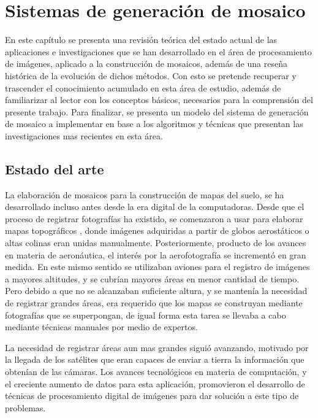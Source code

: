 \chapter{Sistemas de generación de mosaico}
\label{capitulo2}

En este capítulo se presenta una revisión teórica del estado actual de las aplicaciones e investigaciones que se han desarrollado en el área de procesamiento de imágenes, aplicado a la construcción de mosaicos, además de una reseña histórica de la evolución de dichos métodos. Con esto se pretende recuperar y trascender el conocimiento acumulado en esta área de estudio, además de familiarizar al lector con los conceptos básicos, necesarios para la comprensión del presente trabajo. Para finalizar, se presenta un modelo del sistema de generación de mosaico a implementar en base a los algoritmos y técnicas que presentan las investigaciones mas recientes en esta área. 

\section{Estado del arte}

La elaboración de mosaicos para la construcción de mapas del suelo, se ha desarrollado incluso antes desde la era digital de la computadoras. Desde que el proceso de registrar fotografías ha existido, se comenzaron a usar para elaborar mapas topográficos \cite{primeros-mapas}, donde imágenes adquiridas a partir de globos aerostáticos o altas colinas eran unidas manualmente. Posteriormente, producto de los avances en materia de aeronáutica, el interés por la aerofotografía se incrementó en gran medida. En este mismo sentido se utilizaban aviones para el registro de imágenes a mayores altitudes, y se cubrían mayores áreas en menor cantidad de tiempo. Pero debido a que no se alcanzaban suficiente altura, y se mantenía la necesidad de registrar grandes áreas, era requerido que los mapas se construyan mediante fotografías que se superpongan, de igual forma esta tarea se llevaba a cabo mediante técnicas manuales por medio de expertos.

La necesidad de registrar áreas aun mas grandes siguió avanzando, motivado por la llegada de los satélites que eran capaces de enviar a tierra la información que obtenían de las cámaras. Los avances tecnológicos en materia de computación, y el creciente aumento de datos para esta aplicación, promovieron el desarrollo de técnicas de procesamiento digital de imágenes para dar solución a este tipo de problemas.

